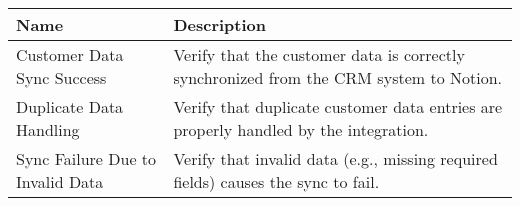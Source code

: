 \documentclass{article}
\begin{document}
            \begin{longtable}{|p{}|p{}|}
            \hline
            \textbf{Name} & \textbf{Description} \\
            \hline
            Customer Data Sync Success & Verify that the customer data is correctly synchronized from the CRM system to Notion. \\
\hline
Duplicate Data Handling & Verify that duplicate customer data entries are properly handled by the integration. \\
\hline
Sync Failure Due to Invalid Data & Verify that invalid data (e.g., missing required fields) causes the sync to fail. \\
\hline
\end{longtable}
\end{document}
